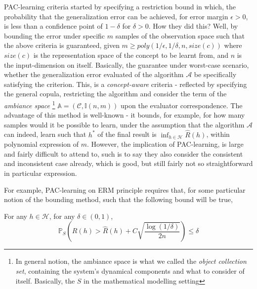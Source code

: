 PAC-learning criteria started by specifying a restriction bound in which, the probability that the generalization error can be achieved, for error margin $\epsilon > 0$, is less than a confidence point of $1-\delta$ for $\delta > 0$. How they did this? Well, by bounding the error under specific $m$ samples of the observation space such that the above criteria is guaranteed, given $m\geq poly(1/\epsilon, 1/\delta, n,size(c))$ where $size(c)$ is the representation space of the concept to be learnt from, and $n$ is the input-dimension on itself. Basically, the guarantee under worst-case scenario, whether the generalization error evaluated of the algorithm $\mathcal{A}$ be specifically satisfying the criterion. This, is a \textit{concept-aware} criteria - reflected by specifying the general copula, restricting the algorithm and consider the term of the \textit{ambiance space} \footnote{In general notion, the ambiance space is what we called the \textit{object collection set}, containing the system's dynamical components and what to consider of itself. Basically, the $S$ in the mathematical modelling setting} $\mathbb{A}=(\mathcal{C},\mathbb{I}(n,m))$ upon the evaluator correspondence. The advantage of this method is well-known - it bounds, for example, for how many samples would it be possible to learn, under the assumption that the algorithm $\mathcal{A}$ can indeed, learn such that $h^{*}$ of the final result is $\inf_{h\in\mathcal{H}}\hat{R}(h)$, within polynomial expression of $m$. However, the implication of PAC-learning, is large and fairly difficult to attend to, such is to say they also consider the consistent and inconsistent case already, which is good, but still fairly not so straightforward in particular expression. 

For example, PAC-learning on ERM principle requires that, for some particular notion of the bounding method, such that the following bound will be true, 


\begin{proposition}\label{prop:PAC_ERM_1_recite}
    For any $h\in\mathcal{H}$, for any $\delta\in(0,1)$, 
    \begin{equation}
        \mathbb{P}_{S}\left( R(h) > \hat{R}(h)+ C\sqrt{\frac{\log{(1/\delta)}}{2n}}\right)\leq \delta
    \end{equation}
\end{proposition}

